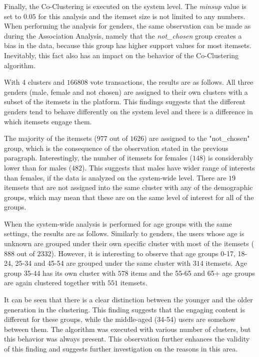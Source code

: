 Finally, the Co-Clustering is executed on the system level. The \emph{minsup} value is set to $0.05$ for this analysis and the itemset size is not limited to any numbers. When performing the analysis for genders, the same observation can be made as during the Association Analysis, namely that the \emph{not\_chosen} group creates a bias in the data, because this group has higher support values for most itemsets. Inevitably, this fact also has an impact on the behavior of the Co-Clustering algorithm. 

With 4 clusters and $166 808$ vote transactions, the results are as follows. All three genders (male, female and not chosen) are assigned to their own clusters with a subset of the itemsets in the platform. This findings suggests that the different genders tend to behave differently on the system level and there is a difference in which itemsets engage them. 

The majority of the itemsets ($977$ out of $1 626$) are assigned to the "not\_chosen" group, which is the consequence of the observation stated in the previous paragraph. Interestingly, the number of itemsets for females ($148$) is considerably lower than for males ($482$). This suggests that males have wider range of interests than females, if the data is analyzed on the system-wide level. There are $19$ itemsets that are not assigned into the same cluster with any of the demographic groups, which may mean that these are on the same level of interest for all of the groups. 

When the system-wide analysis is performed for age groups with the same settings, the results are as follows. Similarly to genders, the users whose age is unknown are grouped under their own specific cluster with most of the itemsets ($888$ out of $2 332$). However, it is interesting to observe that age groups 0-17, 18-24, 25-34 and 45-54 are grouped under the same cluster with $314$ itemsets. Age group 35-44 has its own cluster with $578$ items and the 55-65 and 65+ age groups are again clustered together with $551$ itemsets. 

It can be seen that there is a clear distinction between the younger and the older generation in the clustering. This finding suggests that the engaging content is different for these groups, while the middle-aged (34-54) users are somehow between them. The algorithm was executed with various number of clusters, but this behavior was always present. This observation further enhances the validity of this finding and suggests further investigation on the reasons in this area.


